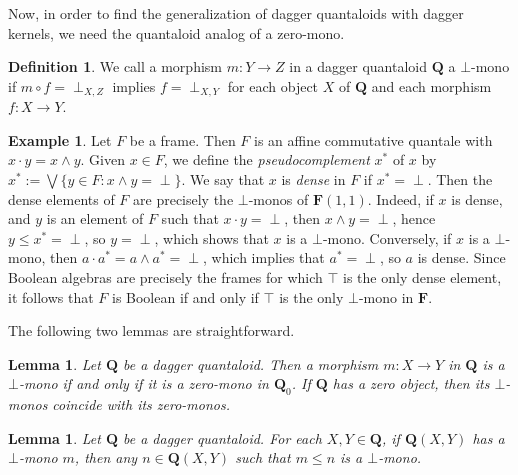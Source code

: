 \documentclass[12pt]{tac}
\newtheorem{lemma}[theorem]{Lemma}
\theoremstyle{definition}
\newtheorem{definition}[theorem]{Definition}
\newtheorem{example}[theorem]{Example}
\theoremstyle{remark}
\newcommand{\<}{\langle}
\renewcommand{\>}{\rangle}
\renewcommand{\:}{\colon}
\begin{document}
Now, in order to find the generalization of dagger quantaloids with dagger kernels, we  need the quantaloid analog of a zero-mono.

\begin{definition}
 We call a morphism $m:Y\to Z$ in a dagger quantaloid $\mathbf Q$ a $\bot$-mono if $m\circ f=\perp_{X,Z}$ implies $f=\perp_{X,Y}$ for each object $X$ of $\mathbf Q$ and each morphism $f:X\to Y$. 
\end{definition}


\begin{example}\label{ex:perp-monos-in-frames}
    Let $F$ be a frame. Then $F$ is an affine commutative quantale with $x\cdot y=x\wedge y$. Given $x\in F$, we define the \emph{pseudocomplement} $x^*$ of $x$ by $x^*:=\bigvee\{y\in F:x\wedge y=\perp\}$. We say that $x$ is \emph{dense} in $F$ if $x^*=\perp$. Then the dense elements of $F$ are precisely the $\bot$-monos of $\mathbf F(1,1)$. Indeed, if $x$ is dense, and $y$ is an element of $F$ such that $x\cdot y=\perp$, then $x\wedge y=\perp$, hence $y\leq x^*=\perp$, so $y=\perp$, which shows that $x$ is a $\bot$-mono. Conversely, if $x$ is a $\bot$-mono, then $a\cdot a^*=a\wedge a^*=\perp$, which implies that $a^*=\perp$, so $a$ is dense. Since Boolean algebras are precisely the frames for which $\top$ is the only dense element, it follows that $F$ is Boolean if and only if $\top$ is the only $\bot$-mono in $\mathbf F$.
\end{example}


The following two lemmas are straightforward.


\begin{lemma}\label{lem:perp-mono-in-Qiszero-mono-inQ0}
    Let $\mathbf Q$ be a dagger quantaloid. Then a morphism $m:X\to Y$ in $\mathbf Q$ is a $\bot$-mono if and only if it is a zero-mono in $\mathbf Q_0$.  If $\mathbf Q$ has a zero object, then its $\bot$-monos coincide with its zero-monos.
\end{lemma}


\begin{lemma}\label{lem:zeromonoeffect implies topzeromono}
Let $\mathbf Q$ be a dagger quantaloid. For each $X,Y\in\mathbf Q$, if $\mathbf Q(X,Y)$ has a $\bot$-mono $m$, then any $n\in \mathbf Q(X,Y)$ such that $m\leq n$ is a $\bot$-mono.
\end{lemma}
\end{document}
